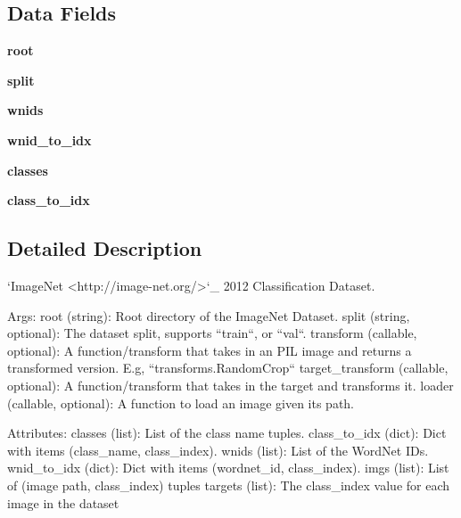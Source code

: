 \subsection*{Data Fields}
\begin{DoxyCompactItemize}
\item 
\mbox{\label{classtorchvision_1_1datasets_1_1imagenet_1_1ImageNet_a0ab8e28fc2e0171cad4c8f81cae79ac2}} 
{\bfseries root}
\item 
\mbox{\label{classtorchvision_1_1datasets_1_1imagenet_1_1ImageNet_a7a7f7be9d44cea4780987fa0a4fa1659}} 
{\bfseries split}
\item 
\mbox{\label{classtorchvision_1_1datasets_1_1imagenet_1_1ImageNet_a08ed3c2bdc5c15d0e4b4b84f92bef7fc}} 
{\bfseries wnids}
\item 
\mbox{\label{classtorchvision_1_1datasets_1_1imagenet_1_1ImageNet_adb5d5592a2ed54f521e3187c3bd2fcbf}} 
{\bfseries wnid\+\_\+to\+\_\+idx}
\item 
\mbox{\label{classtorchvision_1_1datasets_1_1imagenet_1_1ImageNet_a880dcc7c0768890e31d3eaedafb20642}} 
{\bfseries classes}
\item 
\mbox{\label{classtorchvision_1_1datasets_1_1imagenet_1_1ImageNet_a48404c76d83d9107572518dd15fc5bea}} 
{\bfseries class\+\_\+to\+\_\+idx}
\end{DoxyCompactItemize}


\subsection{Detailed Description}
\begin{DoxyVerb}`ImageNet <http://image-net.org/>`_ 2012 Classification Dataset.

Args:
    root (string): Root directory of the ImageNet Dataset.
    split (string, optional): The dataset split, supports ``train``, or ``val``.
    transform (callable, optional): A function/transform that  takes in an PIL image
        and returns a transformed version. E.g, ``transforms.RandomCrop``
    target_transform (callable, optional): A function/transform that takes in the
        target and transforms it.
    loader (callable, optional): A function to load an image given its path.

 Attributes:
    classes (list): List of the class name tuples.
    class_to_idx (dict): Dict with items (class_name, class_index).
    wnids (list): List of the WordNet IDs.
    wnid_to_idx (dict): Dict with items (wordnet_id, class_index).
    imgs (list): List of (image path, class_index) tuples
    targets (list): The class_index value for each image in the dataset
\end{DoxyVerb}
 

